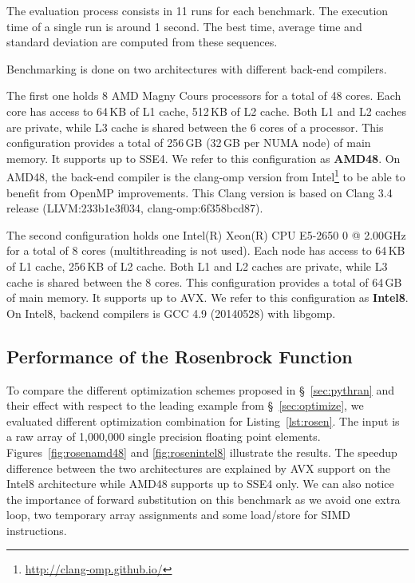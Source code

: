 \documentclass[10pt, preprint]{sigplanconf}
\begin{document}
The evaluation process consists in  11 runs for each benchmark. The execution
time of a single run is around 1 second.  The best time, average time and
standard deviation are computed from these sequences.

Benchmarking is done on two architectures with different back-end compilers.

The first one holds 8 AMD Magny Cours processors for a
total of 48 cores. Each core has access to 64\,KB of L1 cache,
512\,KB of L2 cache. Both L1 and L2 caches are private, while L3 cache
is shared between the 6 cores of a processor. This configuration
provides a total of 256\,GB (32\,GB per NUMA node) of main memory. It supports
up to SSE4. We refer to this configuration as \textbf{AMD48}.
On AMD48, the back-end compiler is the clang-omp
version from Intel\footnote{\url{http://clang-omp.github.io/}} to be able to
benefit from OpenMP improvements. This Clang version is based on Clang 3.4
release (LLVM:233b1e3f034, clang-omp:6f358bcd87).

The second configuration holds one Intel(R) Xeon(R) CPU E5-2650 0 @ 2.00GHz for a total of
8 cores (multithreading is not used). Each node has access to 64\,KB of L1
cache, 256\,KB of L2 cache. Both L1 and L2 caches are private, while L3 cache
is shared between the 8 cores. This configuration provides a total of 64\,GB of 
main memory. It supports up to AVX. We refer to this configuration as
\textbf{Intel8}.
On Intel8, backend compilers is GCC 4.9 (20140528) with libgomp.


\subsection{Performance of the Rosenbrock Function}

To compare the different optimization schemes proposed in \S~\ref{sec:pythran} and their effect with respect to the leading example from \S~\ref{sec:optimize}, we evaluated different optimization combination for Listing~\ref{lst:rosen}. The input is a raw array of 1,000,000 single precision floating point elements.
Figures~\ref{fig:rosenamd48} and \ref{fig:rosenintel8} illustrate the results.
The speedup difference between the two architectures are explained by AVX support on
the Intel8 architecture while AMD48 supports up to SSE4 only.
We can also notice the importance of forward substitution on this benchmark as
we avoid one extra loop, two temporary array assignments and some load/store for
SIMD instructions.
\end{document}
